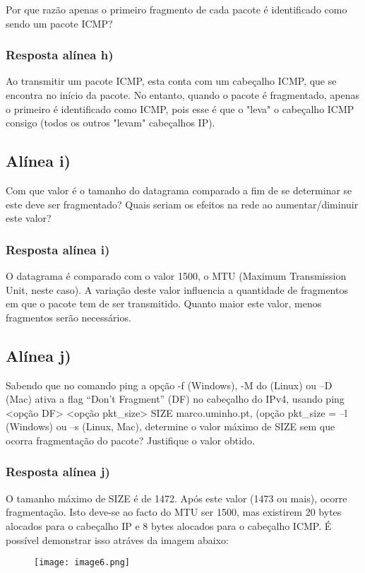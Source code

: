 \documentclass{article}
\begin{document}
Por que razão apenas o primeiro fragmento de cada pacote é identificado como sendo um pacote ICMP?

\subsubsection{Resposta alínea h)}

Ao transmitir um pacote ICMP, esta conta com um cabeçalho ICMP, que se encontra no início da pacote. No entanto, quando o pacote é fragmentado, apenas o primeiro é identificado como ICMP, pois esse é que o "leva" o cabeçalho ICMP consigo (todos os outros "levam" cabeçalhos IP).

\subsection{Alínea i)}

Com que valor é o tamanho do datagrama comparado a fim de se determinar se este deve ser fragmentado?
Quais seriam os efeitos na rede ao aumentar/diminuir este valor?

\subsubsection{Resposta alínea i)}
O datagrama é comparado com o valor 1500, o MTU (Maximum Transmission Unit, neste caso). A variação deste valor influencia a quantidade de fragmentos em que o pacote tem de ser transmitido. Quanto maior este valor, menos fragmentos serão necessários.

\subsection{Alínea j)}

Sabendo que no comando ping a opção -f (Windows), -M do (Linux) ou –D (Mac) ativa a flag “Don’t Fragment”
(DF) no cabeçalho do IPv4, usando ping <opção DF> <opção pkt\_size> SIZE marco.uminho.pt, (opção pkt\_size
= –l (Windows) ou –s (Linux, Mac), determine o valor máximo de SIZE sem que ocorra fragmentação do pacote?
Justifique o valor obtido.

\subsubsection{Resposta alínea j)}
O tamanho máximo de SIZE é de 1472. Após este valor (1473 ou mais), ocorre fragmentação. Isto deve-se ao facto do MTU ser 1500, mas existirem 20 bytes alocados para o cabeçalho IP e 8 bytes alocados para o cabeçalho ICMP. É possível demonstrar isso atráves da imagem abaixo:
\begin{figure}[h]
    \centering
    \texttt{[image: image6.png]}
\end{figure}
\end{document}
